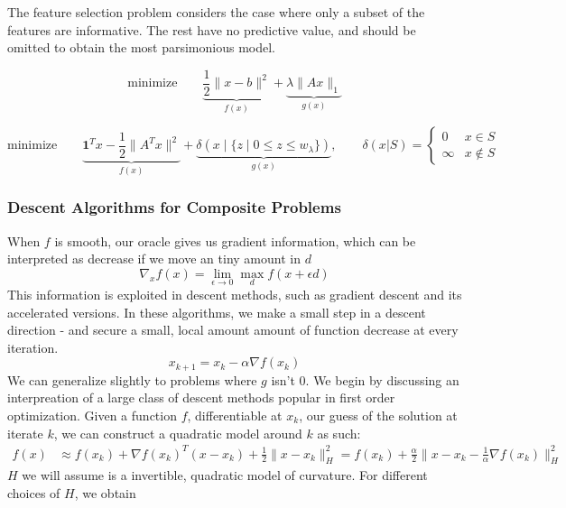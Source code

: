 \begin{example} 
The feature selection problem considers the case where
only a subset of the features are informative. The rest have no
predictive value, and should be omitted to obtain the most
parsimonious model. 
\end{example}

\begin{example}

\begin{equation}
\mbox{minimize}\qquad \underset{f(x)}{\underbrace{\frac{1}{2}\|x-b\|^{2}}}+\underset{g(x)}{\underbrace{\lambda\|Ax\|_{1}}}\end{equation}
\end{example}

\begin{example}
\[
\mbox{minimize}\qquad
\underset{f(x)}{\underbrace{\mathbf{1}^{T}x-\frac{1}{2}\|A^{T}x\|^{2}}}+
\underset{g(x)}{\underbrace{\delta(x\mid \{ z \mid 0\leq z\leq w_{\lambda} \})}},
\qquad\delta(x|S)=\begin{cases}
0 & x\in S\\
\infty & x\notin S
\end{cases}
\]

\end{example}

\subsubsection{Descent Algorithms for Composite Problems}
When $f$ is smooth,
our oracle gives us gradient information, which can be interpreted as decrease
if we move an tiny amount in $d$
$$
\nabla_x f(x) = \lim_{\epsilon \rightarrow 0}\max_d f(x + \epsilon d)
$$
This information is exploited in descent methods, such as gradient
descent and its accelerated versions. In these algorithms, we make a 
small step in a descent direction - and secure a small, local amount
amount of function decrease at every iteration. 
$$
x_{k+1} = x_k - \alpha \nabla f(x_k)
$$
We can generalize slightly to problems where $g$ isn't $0$. We begin by
discussing an interpreation of a large class of descent methods popular in
first order optimization. Given a  function $f$, differentiable at $x_k$, our
guess of the solution at  iterate $k$, we can construct a quadratic model
around $k$ as such:
\begin{align*} 
f(x) & \approx f(x_{k})+\nabla f(x_{k})^{T}(x-x_{k})+\frac{1}{2}\|x-x_{k}\|_{H}^{2} =f(x_{k})+\frac{\alpha}{2}\|x-x_{k}-\frac{1}{\alpha}\nabla f(x_{k})\|_H^{2}
\end{align*}
$H$ we will assume is a invertible, quadratic model of curvature. For
different choices of $H$, we obtain

